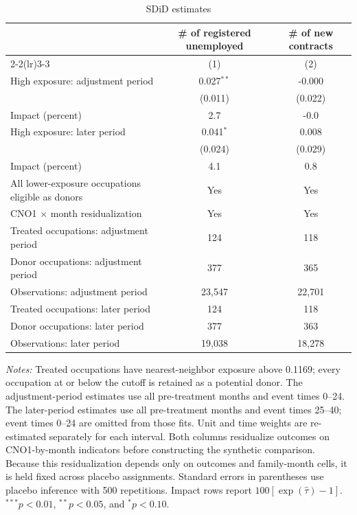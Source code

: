 \begin{table}[H]
\centering
\caption{SDiD estimates}
\label{tab:v1_sdid}
\begin{threeparttable}
\small
\setlength{\tabcolsep}{4pt}
\begin{tabular}{lcc}
\toprule
& \multicolumn{1}{c}{\# of registered unemployed} & \multicolumn{1}{c}{\# of new contracts} \\
\cmidrule(lr){2-2}\cmidrule(lr){3-3}
& (1) & (2) \\
\midrule
High exposure: adjustment period & 0.027$^{**}$ & -0.000 \\
 & (0.011) & (0.022) \\
Impact (percent) & 2.7 & -0.0 \\
\addlinespace
High exposure: later period & 0.041$^{*}$ & 0.008 \\
 & (0.024) & (0.029) \\
Impact (percent) & 4.1 & 0.8 \\
\midrule
All lower-exposure occupations eligible as donors & Yes & Yes \\
CNO1 $\times$ month residualization & Yes & Yes \\
Treated occupations: adjustment period & 124 & 118 \\
Donor occupations: adjustment period & 377 & 365 \\
Observations: adjustment period & 23,547 & 22,701 \\
Treated occupations: later period & 124 & 118 \\
Donor occupations: later period & 377 & 363 \\
Observations: later period & 19,038 & 18,278 \\
\bottomrule
\end{tabular}
\begin{tablenotes}[flushleft]
\footnotesize
\item \emph{Notes:} Treated occupations have nearest-neighbor exposure above 0.1169; every occupation at or below the cutoff is retained as a potential donor. The adjustment-period estimates use all pre-treatment months and event times 0--24. The later-period estimates use all pre-treatment months and event times 25--40; event times 0--24 are omitted from those fits. Unit and time weights are re-estimated separately for each interval. Both columns residualize outcomes on CNO1-by-month indicators before constructing the synthetic comparison. Because this residualization depends only on outcomes and family-month cells, it is held fixed across placebo assignments. Standard errors in parentheses use placebo inference with 500 repetitions. Impact rows report $100[\exp(\widehat{\tau})-1]$. $^{***}p<0.01$, $^{**}p<0.05$, and $^{*}p<0.10$.
\end{tablenotes}
\end{threeparttable}
\end{table}
